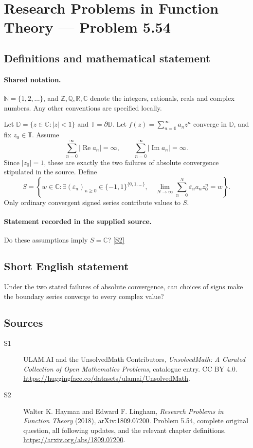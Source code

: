 \documentclass[11pt]{book}
\newcommand{\sref}[2]{\hyperlink{source:#1:#2}{[S#2]}}
\begin{document}
\section{Research Problems in Function Theory — Problem 5.54}\label{statement}

\subsection{Definitions and mathematical statement}

\paragraph{Shared notation.}$\mathbb N=\{1,2,\ldots\}$, and $\mathbb Z,\mathbb Q,\mathbb R,\mathbb C$ denote the integers, rationals, reals and complex numbers. Any other conventions are specified locally.


Let $\mathbb D=\{z\in\mathbb C:|z|<1\}$ and $\mathbb T=\partial\mathbb D$. Let $f(z)=\sum_{n=0}^{\infty}a_nz^n$ converge in $\mathbb D$, and fix $z_0\in\mathbb T$. Assume \[\sum_{n=0}^{\infty}|\operatorname{Re}a_n|=\infty,\qquad\sum_{n=0}^{\infty}|\operatorname{Im}a_n|=\infty.\] Since $|z_0|=1$, these are exactly the two failures of absolute convergence stipulated in the source. Define \[S=\left\{w\in\mathbb C:\exists(\varepsilon_n)_{n\ge0}\in\{-1,1\}^{\{0,1,\ldots\}},\quad\lim_{N\to\infty}\sum_{n=0}^{N}\varepsilon_na_nz_0^n=w\right\}.\] Only ordinary convergent signed series contribute values to $S$.
\paragraph{Statement recorded in the supplied source.}
Do these assumptions imply $S=\mathbb C$? \sref{statement}{2}
\subsection{Short English statement}
Under the two stated failures of absolute convergence, can choices of signs make the boundary series converge to every complex value?
\subsection{Sources}
\begin{description}
\item[\hypertarget{source:statement:1}{S1}] ULAM.AI and the UnsolvedMath Contributors, \emph{UnsolvedMath: A Curated Collection of Open Mathematics Problems}, catalogue entry. CC BY 4.0. \url{https://huggingface.co/datasets/ulamai/UnsolvedMath}.
\item[\hypertarget{source:statement:2}{S2}] Walter K. Hayman and Edward F. Lingham, \emph{Research Problems in Function Theory} (2018), arXiv:1809.07200. Problem 5.54, complete original question, all following updates, and the relevant chapter definitions. \url{https://arxiv.org/abs/1809.07200}.
\end{description}
\label{end:statement}
\end{document}
